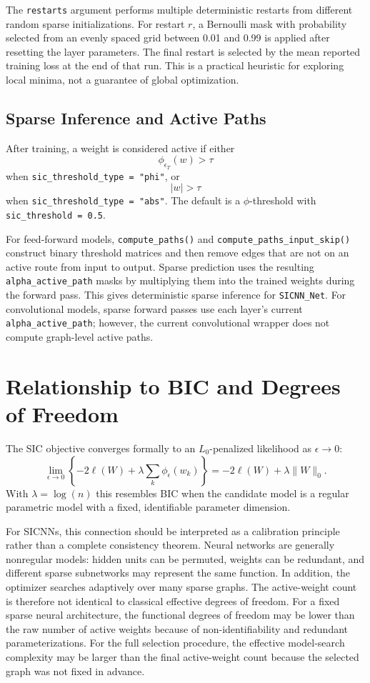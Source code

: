 \documentclass{article}
\begin{document}
The \texttt{restarts} argument performs multiple deterministic restarts from different random sparse initializations. For restart $r$, a Bernoulli mask with probability selected from an evenly spaced grid between 0.01 and 0.99 is applied after resetting the layer parameters. The final restart is selected by the mean reported training loss at the end of that run. This is a practical heuristic for exploring local minima, not a guarantee of global optimization.

\subsection{Sparse Inference and Active Paths}
After training, a weight is considered active if either
\[
\phi_{\epsilon_T}(w)>\tau
\]
when \texttt{sic\_threshold\_type = "phi"}, or
\[
|w|>\tau
\]
when \texttt{sic\_threshold\_type = "abs"}. The default is a $\phi$-threshold with \texttt{sic\_threshold = 0.5}.

For feed-forward models, \texttt{compute\_paths()} and \texttt{compute\_paths\_input\_skip()} construct binary threshold matrices and then remove edges that are not on an active route from input to output. Sparse prediction uses the resulting \texttt{alpha\_active\_path} masks by multiplying them into the trained weights during the forward pass. This gives deterministic sparse inference for \texttt{SICNN\_Net}. For convolutional models, sparse forward passes use each layer's current \texttt{alpha\_active\_path}; however, the current convolutional wrapper does not compute graph-level active paths.

\section{Relationship to BIC and Degrees of Freedom}
The SIC objective converges formally to an $L_0$-penalized likelihood as $\epsilon \to 0$:
\begin{equation}
\lim_{\epsilon\to 0}
\left\{-2\ell(W)+\lambda\sum_k \phi_\epsilon(w_k)\right\}
= -2\ell(W)+\lambda\|W\|_0.
\end{equation}
With $\lambda=\log(n)$ this resembles BIC when the candidate model is a regular parametric model with a fixed, identifiable parameter dimension.

For SICNNs, this connection should be interpreted as a calibration principle rather than a complete consistency theorem. Neural networks are generally nonregular models: hidden units can be permuted, weights can be redundant, and different sparse subnetworks may represent the same function. In addition, the optimizer searches adaptively over many sparse graphs. The active-weight count is therefore not identical to classical effective degrees of freedom. For a fixed sparse neural architecture, the functional degrees of freedom may be lower than the raw number of active weights because of non-identifiability and redundant parameterizations. For the full selection procedure, the effective model-search complexity may be larger than the final active-weight count because the selected graph was not fixed in advance.
\end{document}
